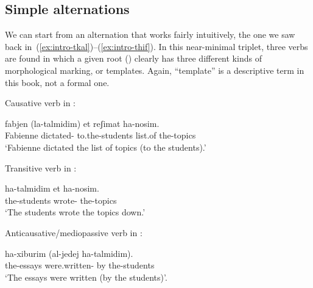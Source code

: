 \begin{exe}
\begin{xlist}
\begin{exe}
\begin{exe}
\begin{exe}
\begin{exe}
\begin{xlist}
\begin{exe}
\begin{xlist}
\begin{xlist}
\begin{xlist}
\begin{exe}
\begin{xlist}
\begin{exe}
\begin{exe}
\begin{xlist}
\begin{exe}
\begin{xlist}
\begin{exe}
\begin{exe}
\begin{xlist}
\begin{exe}
\begin{xlist}
\begin{exe}
\begin{xlist}
\begin{exe}
\begin{exe}
\begin{xlist}
\begin{exe}
\begin{exe}
\begin{xlist}
\begin{exe}
\begin{xlist}
\begin{exe}
\begin{xlist}
\begin{xlist}
\begin{exe}
\begin{exe}
\begin{xlist}
\begin{exe}
\begin{xlist}
	\subsection{Simple alternations}
We can start from an alternation that works fairly intuitively, the one we saw back in~(\ref{ex:intro-tkal})--(\ref{ex:intro-thif}). In this near-minimal triplet, three verbs are found in which a given root () clearly has three different kinds of morphological marking, or templates. Again, ``template'' is a descriptive term in this book, not a formal one.

 \begin{exe}
 \ex \label{ex:general} 
 \begin{xlist} 
 	\ex  Causative verb in {\thif}: 
		
 		\gll  fabjen  (la-talmidim) et reʃimat ha-nosim.\\
 		  Fabienne dictated- to.the-students  list.of the-topics\\
 		\glt `Fabienne dictated the list of topics (to the students).' 
		
 	\ex  Transitive verb in {\tkal}: 
		
 		\gll  ha-talmidim  et ha-nosim.\\
 		  the-students wrote-  the-topics\\
 		\glt `The students wrote the topics down.' 
	
 	\ex  Anticausative/mediopassive verb in {\tnif}: 
		
 		\gll  ha-xiburim  (al-jedej ha-talmidim).\\
 		  the-essays were.written- by the-students\\
 		\glt `The essays were written (by the students)'. 
	
 \z
\z 


\end{xlist}
\end{exe}
\end{xlist}
\end{exe}
\end{xlist}
\end{exe}
\end{exe}
\end{xlist}
\end{xlist}
\end{exe}
\end{xlist}
\end{exe}
\end{xlist}
\end{exe}
\end{exe}
\end{xlist}
\end{exe}
\end{exe}
\end{xlist}
\end{exe}
\end{xlist}
\end{exe}
\end{xlist}
\end{exe}
\end{exe}
\end{xlist}
\end{exe}
\end{xlist}
\end{exe}
\end{exe}
\end{xlist}
\end{exe}
\end{xlist}
\end{xlist}
\end{xlist}
\end{exe}
\end{xlist}
\end{exe}
\end{exe}
\end{exe}
\end{exe}
\end{xlist}
\end{exe}

